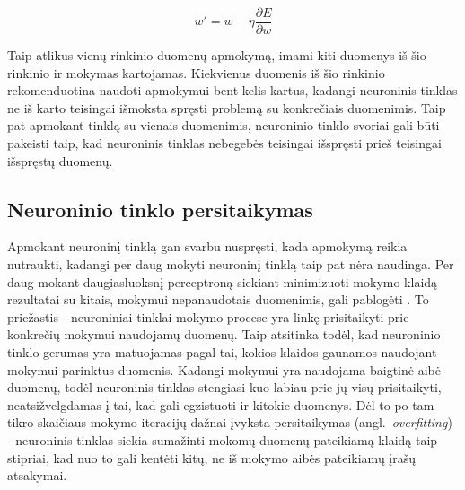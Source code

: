 \documentclass{VUMIFPSbakalaurinis}
\begin{document}
\begin{equation}\label{eq:learning}
w' = w - \eta\frac{\partial E}{\partial w}
\end{equation}

Taip atlikus vienų rinkinio duomenų apmokymą, imami kiti duomenys iš šio rinkinio ir mokymas kartojamas.
Kiekvienus duomenis iš šio rinkinio rekomenduotina naudoti apmokymui bent kelis kartus, kadangi neuroninis tinklas ne iš karto teisingai išmoksta spręsti problemą su konkrečiais duomenimis.
Taip pat apmokant tinklą su vienais duomenimis, neuroninio tinklo svoriai gali būti pakeisti taip, kad neuroninis tinklas nebegebės teisingai išspręsti prieš teisingai išspręstų duomenų.





\subsection{Neuroninio tinklo persitaikymas}


Apmokant neuroninį tinklą gan svarbu nuspręsti, kada apmokymą reikia nutraukti, kadangi per daug mokyti neuroninį tinklą taip pat nėra naudinga.
Per daug mokant daugiasluoksnį perceptroną siekiant minimizuoti mokymo klaidą rezultatai su kitais, mokymui nepanaudotais duomenimis, gali pablogėti \cite[114~psl.]{overfitting}.
To priežastis - neuroniniai tinklai mokymo procese yra linkę prisitaikyti prie konkrečių mokymui naudojamų duomenų.
Taip atsitinka todėl, kad neuroninio tinklo gerumas yra matuojamas pagal tai, kokios klaidos gaunamos naudojant mokymui parinktus duomenis.
Kadangi mokymui yra naudojama baigtinė aibė duomenų, todėl neuroninis tinklas stengiasi kuo labiau prie jų visų prisitaikyti, neatsižvelgdamas į tai, kad gali egzistuoti ir kitokie duomenys.
Dėl to po tam tikro skaičiaus mokymo iteracijų dažnai įvyksta persitaikymas (angl.~\textit{overfitting}) - neuroninis tinklas siekia sumažinti mokomų duomenų pateikiamą klaidą taip stipriai, kad nuo to gali kentėti kitų, ne iš mokymo aibės pateikiamų įrašų atsakymai.
\end{document}
